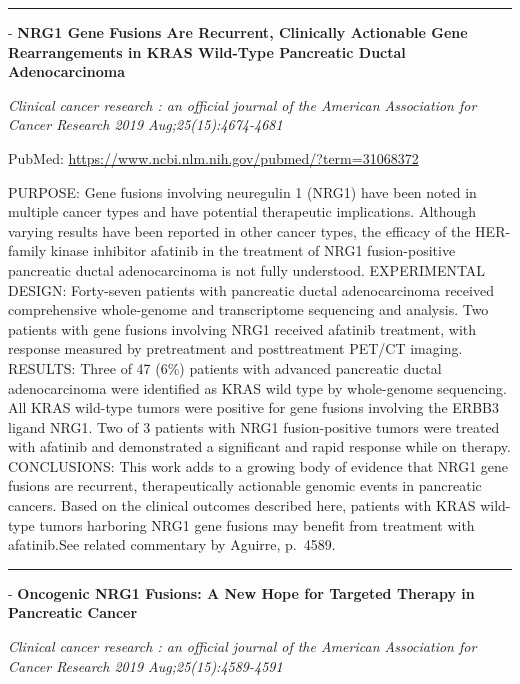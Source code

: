 \documentclass[]{article}
\begin{document}
{}

{}

\begin{center}\rule{0.5\linewidth}{\linethickness}\end{center}

 - \textbf{NRG1 Gene Fusions Are Recurrent, Clinically Actionable Gene
Rearrangements in KRAS Wild-Type Pancreatic Ductal Adenocarcinoma}

\emph{Clinical cancer research : an official journal of the American
Association for Cancer Research 2019 Aug;25(15):4674-4681}

PubMed: \url{https://www.ncbi.nlm.nih.gov/pubmed/?term=31068372}

PURPOSE: Gene fusions involving neuregulin 1 (NRG1) have been noted in
multiple cancer types and have potential therapeutic implications.
Although varying results have been reported in other cancer types, the
efficacy of the HER-family kinase inhibitor afatinib in the treatment of
NRG1 fusion-positive pancreatic ductal adenocarcinoma is not fully
understood. EXPERIMENTAL DESIGN: Forty-seven patients with pancreatic
ductal adenocarcinoma received comprehensive whole-genome and
transcriptome sequencing and analysis. Two patients with gene fusions
involving NRG1 received afatinib treatment, with response measured by
pretreatment and posttreatment PET/CT imaging. RESULTS: Three of 47
(6\%) patients with advanced pancreatic ductal adenocarcinoma were
identified as KRAS wild type by whole-genome sequencing. All KRAS
wild-type tumors were positive for gene fusions involving the ERBB3
ligand NRG1. Two of 3 patients with NRG1 fusion-positive tumors were
treated with afatinib and demonstrated a significant and rapid response
while on therapy. CONCLUSIONS: This work adds to a growing body of
evidence that NRG1 gene fusions are recurrent, therapeutically
actionable genomic events in pancreatic cancers. Based on the clinical
outcomes described here, patients with KRAS wild-type tumors harboring
NRG1 gene fusions may benefit from treatment with afatinib.See related
commentary by Aguirre, p.~4589.

{}

{}

\begin{center}\rule{0.5\linewidth}{\linethickness}\end{center}

 - \textbf{Oncogenic NRG1 Fusions: A New Hope for Targeted Therapy in
Pancreatic Cancer}

\emph{Clinical cancer research : an official journal of the American
Association for Cancer Research 2019 Aug;25(15):4589-4591}
\end{document}

